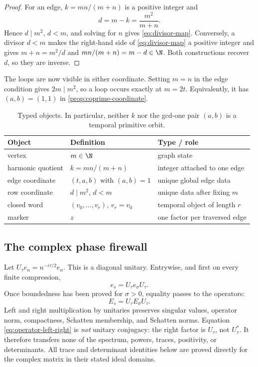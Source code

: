 \begin{proof}
For an edge, $k=mn/(m+n)$ is a positive integer and
\[
 d=m-k=\frac{m^2}{m+n}.
\]
Hence $d\mid m^2$, $d<m$, and solving for $n$ gives
\eqref{eq:divisor-map}.  Conversely, a divisor $d<m$ makes the right-hand
side of \eqref{eq:divisor-map} a positive integer and gives
$m+n=m^2/d$ and $mn/(m+n)=m-d\in\N$.  Both constructions recover $d$,
so they are inverse.
\end{proof}

The loops are now visible in either coordinate.  Setting $m=n$ in the edge
condition gives $2m\mid m^2$, so a loop occurs exactly at $m=2t$.
Equivalently, it has $(a,b)=(1,1)$ in
\cref{prop:coprime-coordinate}.

\FigureTwoCoordinates

\begin{table}[t]
\centering
\small
\begin{tabularx}{\linewidth}{@{}lYY@{}}
\toprule
Object & Definition & Type / role \\
\midrule
vertex & $m\in\N$ & graph state \\
harmonic quotient & $k=mn/(m+n)$ & integer attached to one edge \\
edge coordinate & $(t,a,b)$ with $(a,b)=1$ & unique global edge data \\
row coordinate & $d\mid m^2$, $d<m$ & unique data after fixing $m$ \\
closed word & $(v_0,\ldots,v_r)$, $v_r=v_0$ & temporal object of length $r$ \\
marker & $z$ & one factor per traversed edge \\
\bottomrule
\end{tabularx}
\caption{Typed objects.  In particular, neither $k$ nor the gcd-one pair
$(a,b)$ is a temporal primitive orbit.}
\label{tab:typed-objects}
\end{table}

\subsection{The complex phase firewall}

Let $U_\tau e_n=n^{-i\tau/2}e_n$.  This is a diagonal unitary.  Entrywise,
and first on every finite compression,
\begin{equation}
 e_s=U_\tau e_\sigma U_\tau.
 \label{eq:left-right-factorization}
\end{equation}
Once boundedness has been proved for $\sigma>0$, equality passes to the
operators:
\begin{equation}
 E_s=U_\tau E_\sigma U_\tau.
 \label{eq:operator-left-right}
\end{equation}
Left and right multiplication by unitaries preserves singular values,
operator norm, compactness, Schatten membership, and Schatten norms.
Equation \eqref{eq:operator-left-right} is \emph{not} unitary conjugacy:
the right factor is $U_\tau$, not $U_\tau^*$.  It therefore transfers none
of the spectrum, powers, traces, positivity, or determinants.  All trace
and determinant identities below are proved directly for the complex
matrix in their stated ideal domains.
